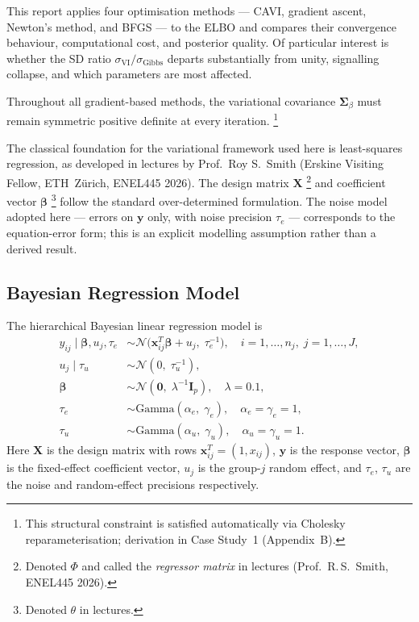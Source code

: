 \documentclass[11pt,a4paper]{article}
\newcommand{\N}{\mathcal{N}}
\begin{document}
This report applies four optimisation methods --- CAVI, gradient ascent, Newton's
method, and BFGS --- to the ELBO and compares their convergence behaviour,
computational cost, and posterior quality.
Of particular interest is whether the SD ratio
$\sigma_{\mathrm{VI}}/\sigma_{\mathrm{Gibbs}}$ departs substantially from unity,
signalling collapse, and which parameters are most affected.

Throughout all gradient-based methods, the variational covariance $\bm{\Sigma}_\beta$
must remain symmetric positive definite at every iteration.%
\footnote{This structural constraint is satisfied automatically via Cholesky
reparameterisation; derivation in Case Study~1 (Appendix~B).}

The classical foundation for the variational framework used here is least-squares
regression, as developed in lectures by Prof.\ Roy S.\ Smith (Erskine Visiting Fellow,
ETH~Z\"{u}rich, ENEL445 2026).
The design matrix $\bm{X}$%
\footnote{Denoted $\Phi$ and called the \emph{regressor matrix} in lectures
(Prof.\ R.\,S.\ Smith, ENEL445 2026).}
and coefficient vector $\bm{\beta}$%
\footnote{Denoted $\theta$ in lectures.}
follow the standard over-determined formulation.
The noise model adopted here --- errors on $\bm{y}$ only, with noise precision
$\tau_e$ --- corresponds to the equation-error form; this is an explicit modelling
assumption rather than a derived result.

\subsection{Bayesian Regression Model}

The hierarchical Bayesian linear regression model is
\begin{align}
y_{ij} \mid \bm{\beta}, u_j, \tau_e
  &\sim \mathcal{N}\!\bigl(\mathbf{x}_{ij}^T\bm{\beta} + u_j,\; \tau_e^{-1}\bigr),
  \quad i=1,\ldots,n_j,\; j=1,\ldots,J, \\
u_j \mid \tau_u &\sim \mathcal{N}(0,\; \tau_u^{-1}), \\
\bm{\beta} &\sim \N(\bm{0},\; \lambda^{-1}\bm{I}_p), \quad \lambda=0.1, \\
\tau_e &\sim \mathrm{Gamma}(\alpha_e,\; \gamma_e), \quad \alpha_e=\gamma_e=1, \\
\tau_u &\sim \mathrm{Gamma}(\alpha_u,\; \gamma_u), \quad \alpha_u=\gamma_u=1.
\end{align}
Here $\bm{X}$ is the design matrix with rows $\mathbf{x}_{ij}^T = (1, x_{ij})$,
$\mathbf{y}$ is the response vector, $\bm{\beta}$ is the fixed-effect coefficient
vector, $u_j$ is the group-$j$ random effect, and $\tau_e$, $\tau_u$ are the
noise and random-effect precisions respectively.
\end{document}
